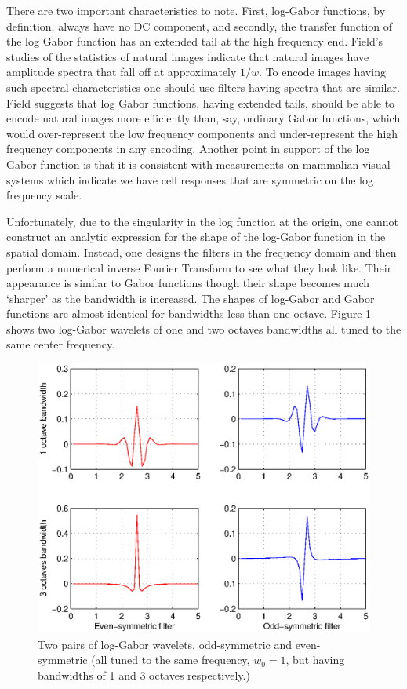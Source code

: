 There are two important characteristics to note. First, log-Gabor
functions, by definition, always have no DC component, and secondly,
the transfer function of the log Gabor function has an extended tail
at the high frequency end. Field's studies of the statistics of
natural images indicate that natural images have amplitude spectra
that fall off at approximately $1/w$. To encode images having such
spectral characteristics one should use filters having spectra that
are similar. Field suggests that log Gabor functions, having
extended tails, should be able to encode natural images more
efficiently than, say, ordinary Gabor functions, which would
over-represent the low frequency components and under-represent the
high frequency components in any encoding. Another point in support
of the log Gabor function is that it is consistent with measurements
on mammalian visual systems which indicate we have cell responses
that are symmetric on the log frequency scale.

Unfortunately, due to the singularity in the log function at the
origin, one cannot construct an analytic expression for the shape of
the log-Gabor function in the spatial domain. Instead, one designs
the filters in the frequency domain and then perform a numerical
inverse Fourier Transform to see what they look like. Their
appearance is similar to Gabor functions though their shape becomes
much `sharper' as the bandwidth is increased. The shapes of
log-Gabor and Gabor functions are almost identical for bandwidths
less than one octave. Figure \ref{fig_logGabor_spatial} shows two
log-Gabor wavelets of one and two octaves bandwidths all tuned to
the same center frequency.
\begin{figure}[tbp]
\begin{center}
\includegraphics[scale = .6]{./chapters/figures/logGabor_spatial_filters.eps}
\caption{Two pairs of log-Gabor wavelets, odd-symmetric and
even-symmetric (all tuned to the same frequency, $w_0 = 1$, but
having bandwidths of 1 and 3 octaves
respectively.)}\label{fig_logGabor_spatial}
\end{center}
\end{figure}

